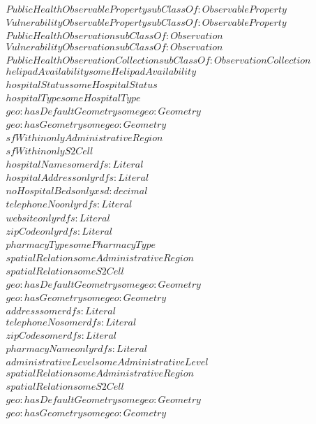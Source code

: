 \begin{align}
  PublicHealthObservableProperty subClassOf: ObservableProperty\\
  VulnerabilityObservableProperty subClassOf: ObservableProperty\\
  PublicHealthObservation subClassOf: Observation\\
  VulnerabilityObservation subClassOf: Observation\\
  PublicHealthObservationCollection subClassOf: ObservationCollection\\
  helipadAvailability some HelipadAvailability \\
  hospitalStatus some HospitalStatus \\
  hospitalType some HospitalType \\
  geo:hasDefaultGeometry some geo:Geometry \\
  geo:hasGeometry some geo:Geometry \\
  sfWithin only AdministrativeRegion \\
  sfWithin only S2Cell \\
  hospitalName some rdfs:Literal \\
  hospitalAddress only rdfs:Literal \\
  noHospitalBeds only xsd:decimal \\
  telephoneNo only rdfs:Literal \\
  website only rdfs:Literal \\
  zipCode only rdfs:Literal \\
  pharmacyType some PharmacyType \\
  spatialRelation some AdministrativeRegion \\
  spatialRelation some S2Cell \\
  geo:hasDefaultGeometry some geo:Geometry \\
  geo:hasGeometry some geo:Geometry \\
  address some rdfs:Literal \\
  telephoneNo some rdfs:Literal \\
  zipCode some rdfs:Literal \\
  pharmacyName only rdfs:Literal \\
  administrativeLevel some AdministrativeLevel \\
  spatialRelation some AdministrativeRegion \\
  spatialRelation some S2Cell \\
  geo:hasDefaultGeometry some geo:Geometry \\
  geo:hasGeometry some geo:Geometry \\

\end{align}
